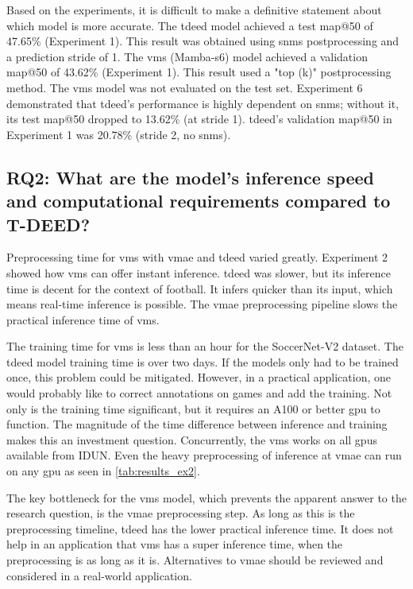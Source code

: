 Based on the experiments, it is difficult to make a definitive statement about which model is more accurate. The \acrshort{tdeed} model achieved a test \acrshort{map}@50 of 47.65\% (Experiment 1). This result was obtained using \acrfull{snms} postprocessing and a prediction stride of 1. The \acrshort{vms} (Mamba-\acrshort{s6}) model achieved a validation \acrshort{map}@50 of 43.62\% (Experiment 1). This result used a "top (k)" postprocessing method. The \acrshort{vms} model was not evaluated on the test set. Experiment 6 demonstrated that \acrshort{tdeed}'s performance is highly dependent on \acrshort{snms}; without it, its test \acrshort{map}@50 dropped to 13.62\% (at stride 1). \acrshort{tdeed}'s validation \acrshort{map}@50 in Experiment 1 was 20.78\% (stride 2, no \acrshort{snms}).

\subsection{RQ2: What are the model’s inference speed and computational requirements compared to T-DEED?}

Preprocessing time for \acrshort{vms} with \acrshort{vmae} and \acrshort{tdeed} varied greatly. Experiment 2 showed how \acrshort{vms} can offer instant inference. \acrshort{tdeed} was slower, but its inference time is decent for the context of football. It infers quicker than its input, which means real-time inference is possible. The \acrshort{vmae} preprocessing pipeline slows the practical inference time of \acrshort{vms}. 

The training time for \acrshort{vms} is less than an hour for the SoccerNet-V2 dataset. The \acrshort{tdeed} model training time is over two days. If the models only had to be trained once, this problem could be mitigated. However, in a practical application, one would probably like to correct annotations on games and add the training. Not only is the training time significant, but it requires an A100 or better \acrshort{gpu} to function. The magnitude of the time difference between inference and training makes this an investment question. Concurrently, the \acrshort{vms} works on all \acrshort{gpu}s available from IDUN. Even the heavy preprocessing of inference at \acrshort{vmae} can run on any \acrshort{gpu} as seen in \cref{tab:results_ex2}.

The key bottleneck for the \acrshort{vms} model, which prevents the apparent answer to the research question, is the \acrshort{vmae} preprocessing step. As long as this is the preprocessing timeline, \acrshort{tdeed} has the lower practical inference time. It does not help in an application that \acrshort{vms} has a super inference time, when the preprocessing is as long as it is. Alternatives to \acrshort{vmae} should be reviewed and considered in a real-world application. 

